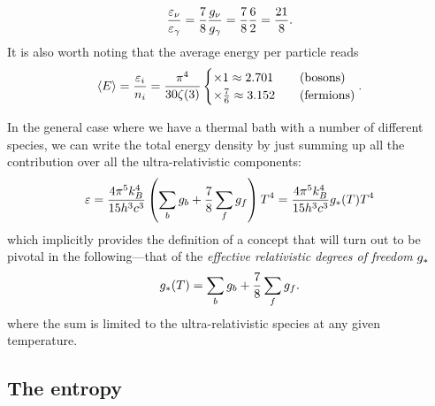 \begin{align*}
  \frac{\varepsilon_\nu}{\varepsilon_\gamma} = \frac{7}{8} \frac{g_\nu}{g_\gamma} =
  \frac{7}{8} \frac{6}{2} = \frac{21}{8}.
\end{align*}
It is also worth noting that the average energy per particle reads
\begin{align}
  \left<E\right> = \frac{\varepsilon_i}{n_i} = \frac{\pi^4}{30 \zeta(3)}
  \begin{cases}
    \times 1 \approx 2.701\quad & \text{(bosons)}\\
    \times \frac{7}{6} \approx 3.152 \quad & \text{(fermions)}
  \end{cases}.
\end{align}

In the general case where we have a thermal bath with a number of different species,
we can write the total energy density by just summing up all the contribution
over all the ultra-relativistic components:
\begin{align}\label{eq:universe_tot_energy_density}
  \varepsilon = \frac{4 \pi^5 k_B^4}{15 h^3 c^3}
  \left(\sum_b g_b + \frac{7}{8} \sum_f g_f\right) T^4 =
  \frac{4 \pi^5 k_B^4}{15 h^3 c^3} g_*(T) T^4
\end{align}
which implicitly provides the definition of a concept that will turn out to be pivotal
in the following---that of the \emph{effective relativistic degrees of freedom} $g_*$
\begin{align}\label{eq:effective_g}
  g_*(T) = \sum_b g_b + \frac{7}{8} \sum_f g_f.
\end{align}
where the sum is limited to the ultra-relativistic species at any given
temperature.



\subsection{The entropy}

